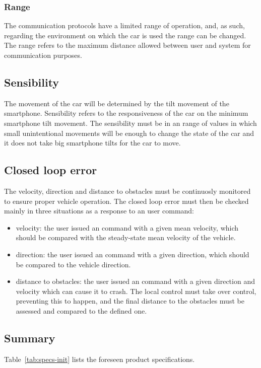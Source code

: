 \subsubsection{Range}%
\label{sec:org447a205}
The communication protocols have a limited range of operation, and, as such, regarding the environment on which the car is used the range can be changed.
The range refers to the maximum distance allowed between user and system for communication purposes.
\subsection{Sensibility}%
\label{sec:org622e63a}
The movement of the car will be determined by the tilt movement of the smartphone. Sensibility refers to the responsiveness of the car on the minimum smartphone tilt movement. The sensibility must be in an range of values in which small unintentional movements will be enough to change the state of the car and it does not take big smartphone tilts for the car to move.
\subsection{Closed loop error}%
\label{sec:org436f732}
The velocity, direction and distance to obstacles must be continuosly monitored to ensure proper vehicle operation. The closed loop error must then be checked mainly in three situations as a response to an user command:
\begin{itemize}
\item velocity: the user issued an command with a given mean velocity, which should be compared with the steady-state mean velocity of the vehicle.
\item direction: the user issued an command with a given direction, which should be compared to the vehicle direction.
\item distance to obstacles: the user issued an command with a given direction and velocity which can cause it to crash. The local control must take over control, preventing this to happen, and the final distance to the obstacles must be assessed and compared to the defined one.
\end{itemize}
\subsection{Summary}%
\label{sec:org1f95256}
Table~\ref{tab:specs-init} lists the foreseen product specifications.


